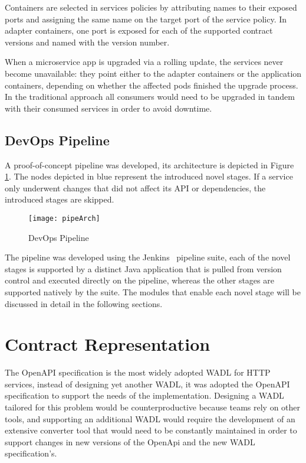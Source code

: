Containers are selected in services policies by attributing names to their exposed ports and assigning the same name on the target port of the service policy.
In adapter containers, one port is exposed for each of the supported contract versions and named with the version number.

When a microservice app is upgraded via a rolling update,
the services never become unavailable:
they point either to the adapter containers or the application containers, depending on whether the affected pods finished the upgrade process.
In the traditional approach all consumers would need to be upgraded in tandem with their consumed services in order to avoid downtime.

\subsection{DevOps Pipeline} %
\label{sec:devops_pipeline_architecture}

A proof-of-concept pipeline was developed, its architecture is depicted in Figure \ref{fig:pipeline}.
The nodes depicted in blue represent the introduced novel stages.
If a service only underwent changes that did not affect its API or dependencies, the introduced stages are skipped.

\begin{figure}[htbp]
    \centering
    \texttt{[image: pipeArch]}
    \caption{DevOps Pipeline}
    \label{fig:pipeline}
\end{figure}

The pipeline was developed using the Jenkins~\cite{jenkins} pipeline suite, each of the novel stages is supported by a distinct Java application that is pulled from version control
and executed directly on the pipeline, whereas the other stages are supported natively by the suite.
The modules that enable each novel stage will be discussed in detail in the following sections.

\section{Contract Representation} %
\label{sec:contract_representation}

The OpenAPI specification is the most
widely adopted WADL for HTTP services, instead of designing yet another WADL, it was
adopted the OpenAPI specification to support the needs of the implementation.
Designing a WADL tailored for this problem would be counterproductive because teams rely on other tools,
and supporting an additional WADL would require the development of an extensive converter tool
that would need to be constantly maintained in order to support changes in new versions of the OpenApi and the new WADL specification's.

